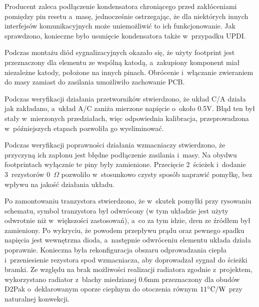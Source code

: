 \documentclass[polish,engineer]{polsl-msth}
\begin{document}
Producent zaleca podłączenie kondensatora chroniącego przed zakłóceniami pomiędzy pin resetu a~masę, jednocześnie ostrzegając, że dla niektórych innych interfejsów komunikacyjnych może uniemożliwić to ich funkcjonowanie\cite{avr_hardware}. Jak sprawdzono, konieczne było usunięcie kondensatora także w~przypadku UPDI.

Podczas montażu diód sygnalizacyjnych okazało się, że użyty footprint jest przeznaczony dla elementu ze wspólną katodą, a~zakupiony komponent miał niezależne katody, położone na innych pinach. Obrócenie i~włączanie zwieraniem do masy zamiast do zasilania umożliwiło zachowanie PCB.

Podczas weryfikacji działania przetworników stwierdzono, że układ C/A działa jak zakładano, a~układ A/C zaniża mierzone napięcie o~około 0.5V. Błąd ten był stały w~mierzonych przedziałach, więc odpowiednia kalibracja, przeprowadzona w~późniejszych etapach pozwoliła go wyeliminować.

Podczas weryfikacji poprawności działania wzmacniaczy stwierdzono, że przyczyną ich zapłonu jest błędne podłączenie zasilania i~masy. Na obydwu footprintach wyłącznie te piny były zamienione. Przecięcie 2~ścieżek i~dodanie 3~rezystorów 0~$\Omega$ pozwoliło w~stosunkowo czysty sposób naprawić pomyłkę, bez wpływu na jakość działania układu.

Po zamontowaniu tranzystora stwierdzono, że w~skutek pomyłki przy rysowaniu schematu, symbol tranzystora był odwrócony (w tym układzie jest użyty odwrotnie niż w~większości zastosowań), a~co za tym idzie, dren ze źródłem był zamieniony. Po wykryciu, że powodem przepływu prądu oraz pewnego spadku napięcia jest wewnętrzna dioda, a~następnie odwróceniu elementu układa działa poprawnie. Konieczna była rekonfiguracja obszaru odprowadzania ciepła i~przeniesienie rezystora spod wzmacniacza, aby doprowadzał sygnał do ścieżki bramki. Ze względu na brak możliwości realizacji radiatora zgodnie z~projektem, wykorzystano radiator z~blachy miedzianej 0.6mm przeznaczony dla obudów D2Pak o~deklarowanym oporze cieplnym do otoczenia równym $\mathrm{11\degree C/W}$ przy naturalnej konwekcji. 
\end{document}
